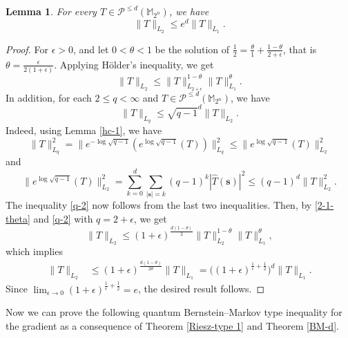 \documentclass{amsbook}
\newtheorem{lemma}[theorem]{Lemma}
\theoremstyle{definition}
\theoremstyle{remark}
\numberwithin{section}{chapter}
\numberwithin{equation}{chapter}
\newcommand{\1}{\mathbf{1}}
\newcommand{\s}{\mathbf{s}}
\begin{document}
\begin{lemma}\label{2-1}
	For every  $T\in\mathcal{P}^{\leq d}(\mathbb{M}_{2^n})$, we have
	$$\|T\|_{L_2}\leq e^{d}\|T\|_{L_1}.$$
\end{lemma}
\begin{proof} For $\epsilon>0$, and let $0<\theta<1$ be the solution of $\frac{1}{2}=\frac{\theta}{1}+\frac{1-\theta}{2+\epsilon}$, that is $\theta=\frac{\epsilon}{2(1+\epsilon)}$. Applying  H\"{o}lder’s inequality, we get
\begin{equation}\label{2-1-theta}
\|T\|_{L_2}\leq \|T\|_{L_{2+\epsilon}}^{1-\theta}\|T\|_{L_1}^\theta.
\end{equation}
In addition, for each $2\leq q<\infty$ and $T\in\mathcal{P}^{\leq d}(\mathbb{M}_{2^n})$, we have
\begin{equation}\label{q-2}
\|T\|_{L_q}\leq \sqrt{q-1}^d\|T\|_{L_2}.
\end{equation}
Indeed, using Lemma \ref{hc-1}, we have
$$\|T\|_{L_q}^2=\|e^{-\log\sqrt{q-1}}(e^{\log\sqrt{q-1}}(T))\|_{L_q}^2\leq \|e^{\log\sqrt{q-1}}(T)\|_{L_2}^2$$
and
$$\|e^{\log\sqrt{q-1}}(T)\|_{L_2}^2=\sum_{k=0}^d\sum_{|\s|=k}(q-1)^k|\widehat{T}(\s)|^2\leq (q-1)^d\|T\|_{L_2}^2.$$
The inequality \eqref{q-2} now follows from the last two inequalities. Then, by \eqref{2-1-theta} and \eqref{q-2} with $q=2+\epsilon$,  we get
$$\|T\|_{L_2}\leq (1+\epsilon)^\frac{d(1-\theta)}{2}\|T\|_{L_2}^{1-\theta}\|T\|_{L_1}^\theta,$$
which implies
\begin{align*}
\|T\|_{L_2}&\leq (1+\epsilon)^\frac{d(1-\theta)}{2\theta}\|T\|_{L_1}=\Big((1+\epsilon)^{\frac{1}{\epsilon}+\frac{1}{2}}\Big)^d\|T\|_{L_1}.
\end{align*}
Since $\lim_{\epsilon\to0}(1+\epsilon)^{\frac{1}{\epsilon}+\frac{1}{2}}=e$, the desired result follows.
\end{proof}


Now we can prove the following quantum Bernstein–Markov type inequality for the gradient  as a
consequence of Theorem \ref{Riesz-type 1} and Theorem \ref{BM-d}.
\end{document}
